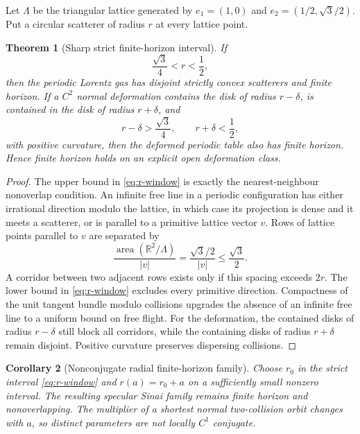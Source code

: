\documentclass[11pt,reqno]{amsart}
\newtheorem{theorem}{Theorem}[section]
\newtheorem{corollary}[theorem]{Corollary}
\theoremstyle{definition}
\theoremstyle{remark}
\newcommand{\R}{\mathbb R}
\newcommand{\abs}[1]{\left\lvert #1\right\rvert}
\begin{document}
Let $\Lambda$ be the triangular lattice generated by
$e_1=(1,0)$ and $e_2=(1/2,\sqrt3/2)$.  Put a circular scatterer of radius $r$
at every lattice point.

\begin{theorem}[Sharp strict finite-horizon interval]\label{thm:triangle}
If
\begin{equation}\label{eq:r-window}
 \frac{\sqrt3}{4}<r<\frac12,
\end{equation}
then the periodic Lorentz gas has disjoint strictly convex scatterers and
finite horizon.  If a $C^2$ normal deformation contains the disk of radius
$r-\delta$, is contained in the disk of radius $r+\delta$, and
\[
 r-\delta>\frac{\sqrt3}{4},
 \qquad r+\delta<\frac12,
\]
with positive curvature, then the deformed periodic table also has finite
horizon.  Hence finite horizon holds on an explicit open deformation class.
\end{theorem}

\begin{proof}
The upper bound in \eqref{eq:r-window} is exactly the nearest-neighbour
nonoverlap condition.  An infinite free line in a periodic configuration has
either irrational direction modulo the lattice, in which case its projection
is dense and it meets a scatterer, or is parallel to a primitive lattice vector
$v$.  Rows of lattice points parallel to $v$ are separated by
\[
 \frac{\operatorname{area}(\R^2/\Lambda)}{\abs v}
 =\frac{\sqrt3/2}{\abs v}
 \le\frac{\sqrt3}{2}.
\]
A corridor between two adjacent rows exists only if this spacing exceeds
$2r$.  The lower bound in \eqref{eq:r-window} excludes every primitive
direction.  Compactness of the unit tangent bundle modulo collisions upgrades
the absence of an infinite free line to a uniform bound on free flight.
For the deformation, the contained disks of radius $r-\delta$ still block all
corridors, while the containing disks of radius $r+\delta$ remain disjoint.
Positive curvature preserves dispersing collisions.
\end{proof}

\begin{corollary}[Nonconjugate radial finite-horizon family]
Choose $r_0$ in the strict interval \eqref{eq:r-window} and
$r(a)=r_0+a$ on a sufficiently small nonzero interval.  The resulting specular
Sinai family remains finite horizon and nonoverlapping.  The multiplier of a
shortest normal two-collision orbit changes with $a$, so distinct parameters
are not locally $C^1$ conjugate.
\end{corollary}
\end{document}
